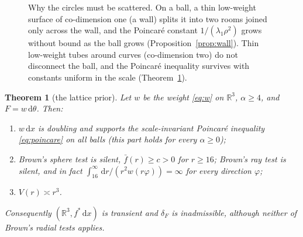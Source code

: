 \documentclass[11pt]{amsart}
\newcommand{\R}{\mathbb{R}}
\newcommand{\dd}{\,\mathrm{d}}
\newcommand{\fbar}{\bar f}
\theoremstyle{plain}
\newtheorem{theorem}{Theorem}[section]
\theoremstyle{definition}
\theoremstyle{remark}
\begin{document}
\begin{figure}[t]
\centering
{}
\caption{Why the circles must be scattered. On a ball, a thin low-weight surface
of co-dimension one (a wall) splits it into two rooms joined only across the
wall, and the Poincar\'e constant $1/(\lambda_1\rho^2)$ grows without bound as
the ball grows (Proposition~\ref{prop:wall}). Thin low-weight tubes around
curves (co-dimension two) do not disconnect the ball, and the Poincar\'e
inequality survives with constants uniform in the scale (Theorem~\ref{thm:B}).}
\label{fig:wallcircle}
\end{figure}

\begin{theorem}[the lattice prior]\label{thm:B}
Let $w$ be the weight \eqref{eq:w} on $\R^3$, $\alpha\ge4$, and $F=w\dd\theta$.
Then:
\begin{enumerate}[label=\textup{(\alph*)},leftmargin=2em,itemsep=2pt]
\item $w\dd x$ is doubling and supports the scale-invariant Poincar\'e
inequality \eqref{eq:poincare} on all balls (this part holds for every
$\alpha\ge0$);
\item Brown's sphere test is silent, $\fbar(r)\ge c>0$ for $r\ge16$; Brown's
ray test is silent, and in fact
$\int_{16}^\infty\dd r/(r^2w(r\varphi))=\infty$ for \emph{every} direction
$\varphi$;
\item $V(r)\asymp r^3$.
\end{enumerate}
Consequently $(\R^3,f^*\dd x)$ is transient and $\delta_F$ is inadmissible,
although neither of Brown's radial tests applies.
\end{theorem}
\end{document}
